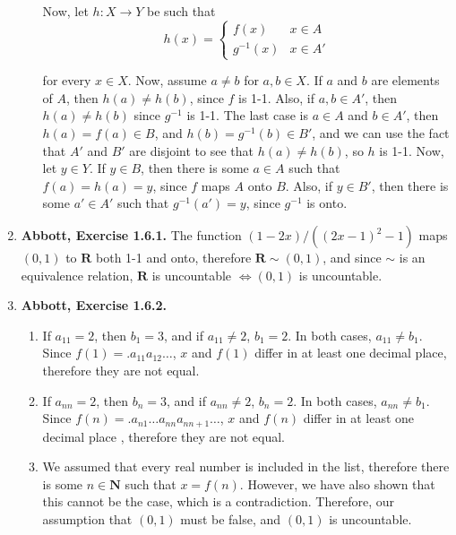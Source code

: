 \documentclass{article}
\newcommand{\N}{\mathbf{N}}
\newcommand{\R}{\mathbf{R}}
\newcommand{\exc}[2][Abbott]{\item \textbf{#1, Exercise #2.}}
\begin{document}
\begin{enumerate}
\begin{enumerate}
		      Now, let $h : X \rightarrow Y$ be such that 
		      \begin{equation*}
		      	h(x) = \begin{cases}
		      	f(x) & x \in A \\ 
		      	g^{-1}(x) & x \in A'
		      	\end{cases}
		      \end{equation*}
		      		      		      	      	      	      	              
		      for every $x \in X$. Now, assume $a \neq b$ for $a, b \in X$. If $a$ and $b$ are elements of $A$, then $h(a) \neq h(b)$, since $f$ is 1-1. Also, if $a,b \in A'$, then $h(a) \neq h(b)$ since $g^{-1}$ is 1-1. The last case is $a \in A$ and $b \in A'$, then $h(a)=f(a) \in B$, and $h(b)=g^{-1}(b) \in B'$, and we can use the fact that $A'$ and $B'$ are disjoint to see that $h(a) \neq h(b)$, so $h$ is 1-1. Now, let $y \in Y$. If $y \in B$, then there is some $a \in A$ such that $f(a)=h(a)=y$, since $f$ maps $A$ onto $B$. Also, if $y \in B'$, then there is some $a' \in A'$ such that $g^{-1}(a') = y$, since $g^{-1}$ is onto.
	\end{enumerate}
				      	          
	\exc{1.6.1}
	The function $(1-2x)/((2x-1)^2-1)$ maps $(0, 1)$ to $\R$ both 1-1 and onto, therefore $\R \sim (0, 1)$, and since $\sim$ is an equivalence relation, $\R$ is uncountable $\iff (0, 1)$ is uncountable. 
				      	          
	\exc{1.6.2}
	\begin{enumerate}
		\item If $a_{11} = 2$, then $b_1 = 3$, and if $a_{11} \neq 2$, $b_1 = 2$. In both cases, $a_{11} \neq b_1$. Since $f(1) = .a_{11} a_{12} \dots$, $x$ and $f(1)$ differ in at least one decimal place, therefore they are not equal.
		      		      		      	      	      	      	              
		\item If $a_{nn} = 2$, then $b_n = 3$, and if $a_{nn} \neq 2$, $b_n = 2$. In both cases, $a_{nn} \neq b_1$. Since $f(n) = .a_{n 1} \dots a_{nn} a_{n n+1} \dots$, $x$ and $f(n)$ differ in at least one decimal place , therefore they are not equal.
		      		      		      	      	      	      	              
		\item We assumed that every real number is included in the list, therefore there is some $n \in \N$ such that $x = f(n)$. However, we have also shown that this cannot be the case, which is a contradiction. Therefore, our assumption that $(0, 1)$ must be false, and $(0, 1)$ is uncountable.
	\end{enumerate}
				      	          

\end{enumerate}
\end{document}
